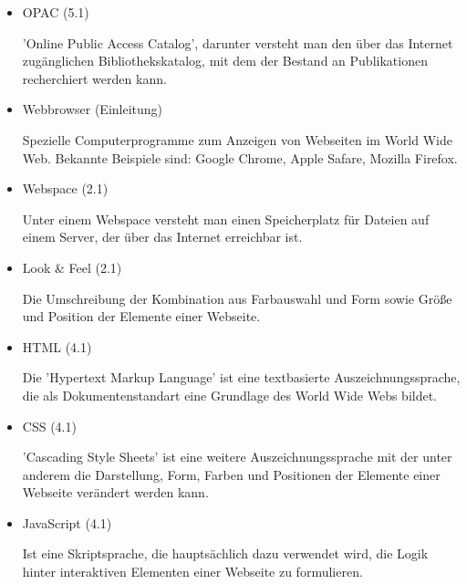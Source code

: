 \documentclass{article}
\begin{document}
\begin{itemize}

\item OPAC (5.1)
\begin{flushleft}
'Online Public Access Catalog', darunter versteht man den über das Internet zugänglichen Bibliothekskatalog, mit dem der Bestand an Publikationen recherchiert werden kann.
\end{flushleft}

\item Webbrowser (Einleitung)
\begin{flushleft}
Spezielle Computerprogramme zum Anzeigen von Webseiten im World Wide Web. Bekannte Beispiele sind: Google Chrome, Apple Safare, Mozilla Firefox.
\end{flushleft}

\item Webspace (2.1)
\begin{flushleft}
Unter einem Webspace versteht man einen Speicherplatz für Dateien auf einem Server, der über das Internet erreichbar ist.
\end{flushleft}

\item Look \& Feel (2.1)
\begin{flushleft}
Die Umschreibung der Kombination aus Farbauswahl und Form sowie Größe und Position der Elemente einer Webseite.
\end{flushleft}

\item HTML (4.1)
\begin{flushleft}
Die 'Hypertext Markup Language' ist eine textbasierte Auszeichnungssprache, die als Dokumentenstandart eine Grundlage des World Wide Webs bildet.
\end{flushleft}

\item CSS (4.1)
\begin{flushleft}
'Cascading Style Sheets' ist eine weitere Auszeichnungssprache mit der unter anderem die Darstellung, Form, Farben und Positionen der Elemente einer Webseite verändert werden kann.
\end{flushleft}

\item JavaScript (4.1)
\begin{flushleft}
Ist eine Skriptsprache, die hauptsächlich dazu verwendet wird, die Logik hinter interaktiven Elementen einer Webseite zu formulieren.
\end{flushleft}


\end{itemize}
\end{document}
